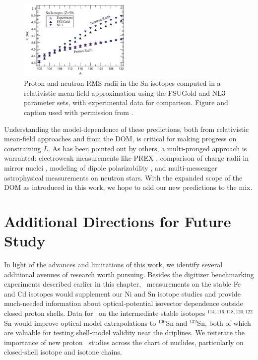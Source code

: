 \begin{figure}
    \centering
    \includegraphics[width=0.48\textwidth]{figures/Piekarewicz2006SnIsotopes.png}
    \caption[Proton and neutron RMS radii in the Sn isotopes computed with FSUGold and NL3
    interactions]
    {
        Proton and neutron RMS radii in the Sn isotopes computed in a relativistic mean-field
        approximation using the FSUGold and NL3 parameter sets, with experimental data for comparison.
        Figure and caption used with permission from \cite{Piekarewicz2006}.
    }
    \label{Piekarewicz2006SnIsotopes}
\end{figure}
Understanding the model-dependence of these predictions, both from relativistic mean-field
approaches and from the DOM, is critical for making progress on constraining
$L$. As has been pointed out by others, a multi-pronged approach 
is warranted: electroweak measurements like PREX \cite{Horowitz2014}, comparison of
charge radii in mirror nuclei \cite{Brown2017}, modeling of dipole
polarizability \cite{Piekarewicz2006}, and multi-messenger astrophysical
measurements on neutron stars. With the expanded scope of the DOM as introduced in
this work, we hope to add our new predictions to the mix.

\section{Additional Directions for Future Study}
In light of the advances and limitations of this work, we identify several
additional avenues of research worth pursuing.
Besides the digitizer benchmarking experiments described earlier
in this chapter, \tot\ measurements on the stable Fe and Cd isotopes would
supplement our Ni and Sn isotope studies and provide much-needed information
about optical-potential isovector dependence outside closed proton shells.
Data for \tot\ on the intermediate stable isotopes $^{114,116,118,120,122}$Sn
would improve optical-model extrapolations to $^{100}$Sn and $^{132}$Sn,
both of which are valuable for testing shell-model validity near the driplines.
We reiterate the importance of new proton \rxn\
studies across the chart of nuclides, particularly on closed-shell isotope and isotone
chains.

